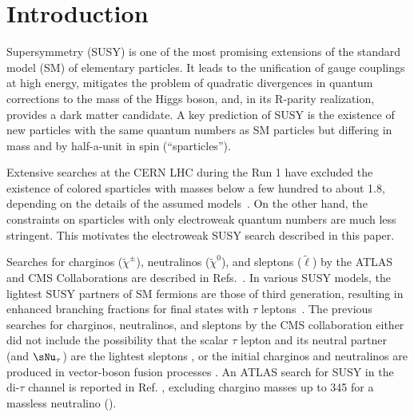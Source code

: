 \section{Introduction}
\label{sect:introduction}

Supersymmetry (SUSY) \cite{Golfand:1971iw,Wess:1973kz,Wess:1974tw,Fayet1,Fayet2} is one of the most promising extensions of the 
standard model (SM) of elementary particles.  It leads to the unification of gauge couplings at
high energy, mitigates the problem of quadratic divergences in quantum corrections to the
mass of the Higgs boson, and, in its R-parity realization, provides a dark matter candidate.
A key prediction of SUSY is the existence of new particles with the same quantum numbers as SM particles but
differing in mass and by half-a-unit in spin (``sparticles'').

Extensive searches at the CERN LHC during the Run 1 have excluded the existence of colored sparticles with masses below a few hundred \GeV to about 1.8\TeV,
depending on the details of the assumed models~\cite{%
Chatrchyan:2013fea,Chatrchyan:2013mys,Chatrchyan:2014aea,Chatrchyan:2014lfa,%
Khachatryan:2015vra,Khachatryan:2015lwa,Aad:2015pfx,Aad:2015iea}. %
On the other hand, the constraints on sparticles with only electroweak quantum numbers are much less stringent.  This motivates the electroweak SUSY search 
described in this paper.


Searches for charginos ($\widetilde{\chi}^{\pm}\xspace$), neutralinos ($\widetilde{\chi}^{0}\xspace$), and sleptons ($\widetilde{\ell}\xspace$) by the ATLAS and CMS Collaborations are described in Refs.~\cite{Aad:2014nua,Aad:2014vma,Khachatryan:2014qwa,Khachatryan:2014mma,Khachatryan:2015kxa}.
In various SUSY models, the lightest SUSY partners of SM fermions are those of third generation, 
resulting in enhanced branching fractions for final states with $\tau$ leptons~\cite{Martin:1997ns}.  
The previous searches for charginos, neutralinos,
and sleptons by the CMS collaboration  
 either did not include the possibility that 
the scalar $\tau$ lepton and its neutral partner (\stau and $\sNu_\tau$) 
are the lightest sleptons \cite{Khachatryan:2014qwa}, or the initial charginos and neutralinos are produced in vector-boson fusion processes \cite{Khachatryan:2015kxa}. An ATLAS search for SUSY in the di-$\tau$ channel is reported in Ref. \cite{Aad:2014yka}, excluding chargino masses up to 345 \GeV 
for a massless neutralino (\PSGczDo).


